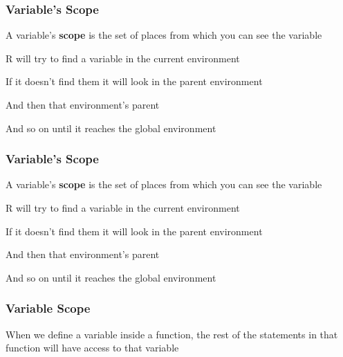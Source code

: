 \documentclass[12pt]{beamer}\usepackage[]{graphicx}\usepackage[]{color}
\begin{document}

\begin{frame}
\frametitle{Variable's Scope}

\bi
  \item A variable's \textbf{scope} is the set of places from which you can see the variable
  \item R will try to find a variable in the current environment
  \item If it doesn't find them it will look in the parent environment
  \item And then that environment's parent
  \item And so on until it reaches the global environment
\ei

\end{frame}


\begin{frame}
\frametitle{Variable's Scope}

\bi
  \item A variable's \textbf{scope} is the set of places from which you can see the variable
  \item R will try to find a variable in the current environment
  \item If it doesn't find them it will look in the parent environment
  \item And then that environment's parent
  \item And so on until it reaches the global environment
\ei

\end{frame}


\begin{frame}
\frametitle{Variable Scope}

\bbi
  \item When we define a variable inside a function, the rest of the statements in that function will have access to that variable
\ei

\end{frame}

\end{document}

